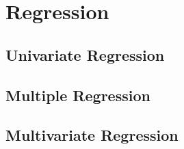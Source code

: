 \chapter{Regression}
\label{ch:capitolo4}


\section{Univariate Regression}

\section{Multiple Regression}

\section{Multivariate Regression}
